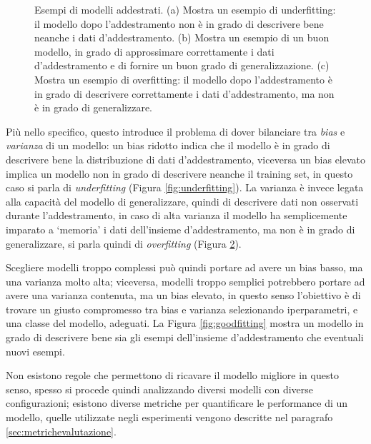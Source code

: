 \documentclass[../../main.tex]{subfiles}
\begin{document}
\begin{figure}[H]
\begin{subfigure}[t]{0.30\textwidth}
        \caption{}
        \label{fig:overfitting}
    \end{subfigure}
    \caption{Esempi di modelli addestrati. (a) Mostra un esempio di underfitting: il modello dopo l'addestramento non è in grado di descrivere bene neanche i dati d'addestramento. (b) Mostra un esempio di un buon modello, in grado di approssimare correttamente i dati d'addestramento e di fornire un buon grado di generalizzazione. (c) Mostra un esempio di overfitting: il modello dopo l'addestramento è in grado di descrivere correttamente i dati d'addestramento, ma non è in grado di generalizzare.}
\end{figure}

Più nello specifico, questo introduce il problema di dover bilanciare tra \textit{bias} e \textit{varianza} di un modello: un bias ridotto indica che il modello è in grado di descrivere bene la distribuzione di dati d'addestramento, viceversa un bias elevato implica un modello non in grado di descrivere neanche il training set, in questo caso si parla di \textit{underfitting} (Figura \ref{fig:underfitting}). La varianza è invece legata alla capacità del modello di generalizzare, quindi di descrivere dati non osservati durante l'addestramento, in caso di alta varianza il modello ha semplicemente imparato a `memoria' i dati dell'insieme d'addestramento, ma non è in grado di generalizzare, si parla quindi di \textit{overfitting} (Figura \ref{fig:overfitting}).

Scegliere modelli troppo complessi può quindi portare ad avere un bias basso, ma una varianza molto alta; viceversa, modelli troppo semplici potrebbero portare ad avere una varianza contenuta, ma un bias elevato, in questo senso l'obiettivo è di trovare un giusto compromesso tra bias e varianza selezionando iperparametri, e una classe del modello, adeguati. La Figura \ref{fig:goodfitting} mostra un modello in grado di descrivere bene sia gli esempi dell'insieme d'addestramento che eventuali nuovi esempi.

Non esistono regole che permettono di ricavare il modello migliore in questo senso, spesso si procede quindi analizzando diversi modelli con diverse configurazioni; esistono diverse metriche per quantificare le performance di un modello, quelle utilizzate negli esperimenti vengono descritte nel paragrafo \ref{sec:metrichevalutazione}.
\end{document}
